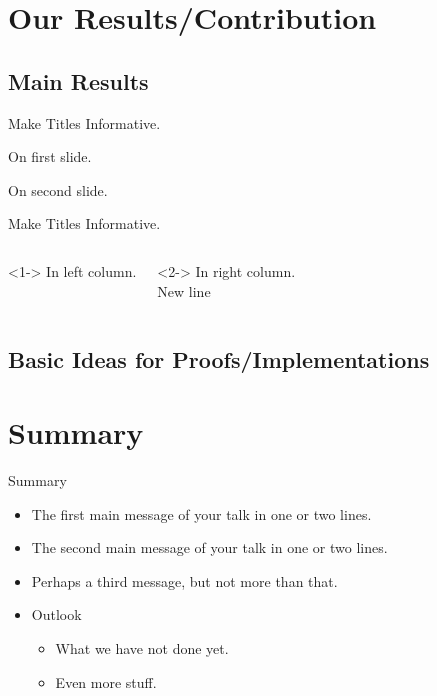 \documentclass[english]{beamer}
\begin{document}
\section{Our Results/Contribution}

\subsection{Main Results}
\begin{frame}{Make Titles Informative. }
\begin{theorem}
On first slide.
\end{theorem}


\pause{}
\begin{corollary}
On second slide.
\end{corollary}

\end{frame}
%
\begin{frame}{Make Titles Informative. }
\begin{columns}[t]

\column{5cm}
\begin{theorem}<1->
In left column.
\end{theorem}


\column{5cm}
\begin{corollary}<2->
In right column.\\
New line
\end{corollary}

\end{columns}

\end{frame}

\subsection{Basic Ideas for Proofs/Implementations}

\section*{Summary}
\begin{frame}{Summary}
\begin{itemize}
\item The \alert{first main message} of your talk in one or two lines.
\item The \alert{second main message} of your talk in one or two lines.
\item Perhaps a \alert{third message}, but not more than that.
\end{itemize}
\medskip{}

\begin{itemize}
\item Outlook
\begin{itemize}
\item What we have not done yet.
\item Even more stuff.
\end{itemize}
\end{itemize}
\end{frame}
\end{document}
